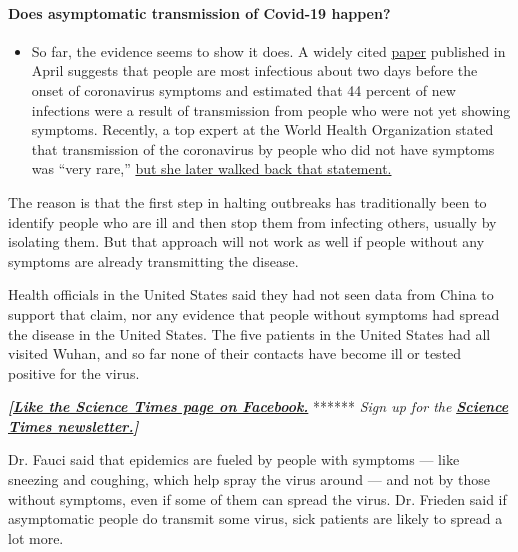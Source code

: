 \begin{itemize}
{  \paragraph{Does asymptomatic transmission of Covid-19
  happen?}\label{does-asymptomatic-transmission-of-covid-19-happen}}

  \begin{itemize}
  \tightlist
  \item
    So far, the evidence seems to show it does. A widely cited
    \href{https://www.nature.com/articles/s41591-020-0869-5}{paper}
    published in April suggests that people are most infectious about
    two days before the onset of coronavirus symptoms and estimated that
    44 percent of new infections were a result of transmission from
    people who were not yet showing symptoms. Recently, a top expert at
    the World Health Organization stated that transmission of the
    coronavirus by people who did not have symptoms was ``very rare,''
    \href{https://www.nytimes.com/2020/06/09/world/coronavirus-updates.html?action=click\&pgtype=Article\&state=default\&region=MAIN_CONTENT_3\&context=storylines_faq\#link-1f302e21}{but
    she later walked back that statement.}
  \end{itemize}
\end{itemize}

The reason is that the first step in halting outbreaks has traditionally
been to identify people who are ill and then stop them from infecting
others, usually by isolating them. But that approach will not work as
well if people without any symptoms are already transmitting the
disease.

Health officials in the United States said they had not seen data from
China to support that claim, nor any evidence that people without
symptoms had spread the disease in the United States. The five patients
in the United States had all visited Wuhan, and so far none of their
contacts have become ill or tested positive for the virus.

\textbf{\emph{{[}}\href{http://on.fb.me/1paTQ1h}{\emph{Like the Science
Times page on Facebook.}}} ****** \emph{\textbar{} Sign up for the}
\textbf{\href{http://nyti.ms/1MbHaRU}{\emph{Science Times
newsletter.}}\emph{{]}}}

Dr. Fauci said that epidemics are fueled by people with symptoms ---
like sneezing and coughing, which help spray the virus around --- and
not by those without symptoms, even if some of them can spread the
virus. Dr. Frieden said if asymptomatic people do transmit some virus,
sick patients are likely to spread a lot more.

